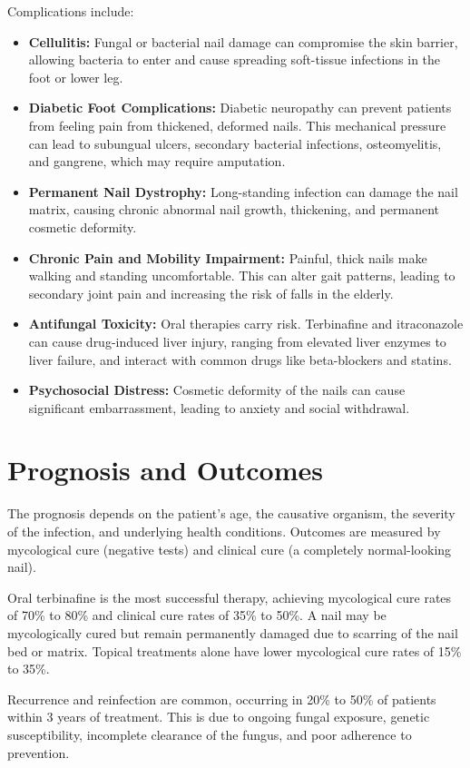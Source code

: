 Complications include:
\begin{itemize}
    \item \textbf{Cellulitis:} Fungal or bacterial nail damage can compromise the skin barrier, allowing bacteria to enter and cause spreading soft-tissue infections in the foot or lower leg.
    \item \textbf{Diabetic Foot Complications:} Diabetic neuropathy can prevent patients from feeling pain from thickened, deformed nails. This mechanical pressure can lead to subungual ulcers, secondary bacterial infections, osteomyelitis, and gangrene, which may require amputation.
    \item \textbf{Permanent Nail Dystrophy:} Long-standing infection can damage the nail matrix, causing chronic abnormal nail growth, thickening, and permanent cosmetic deformity.
    \item \textbf{Chronic Pain and Mobility Impairment:} Painful, thick nails make walking and standing uncomfortable. This can alter gait patterns, leading to secondary joint pain and increasing the risk of falls in the elderly.
    \item \textbf{Antifungal Toxicity:} Oral therapies carry risk. Terbinafine and itraconazole can cause drug-induced liver injury, ranging from elevated liver enzymes to liver failure, and interact with common drugs like beta-blockers and statins.
    \item \textbf{Psychosocial Distress:} Cosmetic deformity of the nails can cause significant embarrassment, leading to anxiety and social withdrawal.
\end{itemize}

\section*{Prognosis and Outcomes}
The prognosis depends on the patient's age, the causative organism, the severity of the infection, and underlying health conditions. Outcomes are measured by mycological cure (negative tests) and clinical cure (a completely normal-looking nail).

Oral terbinafine is the most successful therapy, achieving mycological cure rates of 70\% to 80\% and clinical cure rates of 35\% to 50\%. A nail may be mycologically cured but remain permanently damaged due to scarring of the nail bed or matrix. Topical treatments alone have lower mycological cure rates of 15\% to 35\%.

Recurrence and reinfection are common, occurring in 20\% to 50\% of patients within 3 years of treatment. This is due to ongoing fungal exposure, genetic susceptibility, incomplete clearance of the fungus, and poor adherence to prevention.

